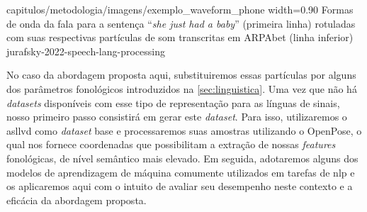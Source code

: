 {capitulos/metodologia/imagens/exemplo_waveform_phone}
{width=0.90\textwidth}
{Formas de onda da fala para a sentença ``\textit{she just had a baby}'' (primeira linha) rotuladas com suas respectivas partículas de som transcritas em ARPAbet (linha inferior)}
{jurafsky-2022-speech-lang-processing}






No caso da abordagem proposta aqui, substituiremos essas partículas por alguns dos parâmetros fonológicos introduzidos na \autoref{sec:linguistica}. Uma vez que não há \textit{datasets} disponíveis com esse tipo de representação para as línguas de sinais, nosso primeiro passo consistirá em gerar este \textit{dataset}. Para isso, utilizaremos o \acrshort{asllvd} como \textit{dataset} base e processaremos suas amostras utilizando o OpenPose, o qual nos fornece coordenadas que possibilitam a extração de nossas \textit{features} fonológicas, de nível semântico mais elevado.
Em seguida, adotaremos alguns dos modelos de aprendizagem de máquina comumente utilizados em tarefas de \acrshort{nlp} e os aplicaremos aqui com o intuito de avaliar seu desempenho neste contexto e a eficácia da abordagem proposta. 

